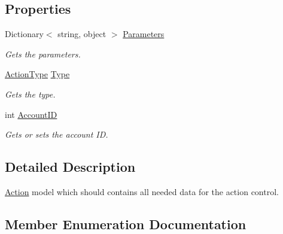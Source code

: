 \subsection*{Properties}
\begin{DoxyCompactItemize}
\item 
Dictionary$<$ string, object $>$ \hyperlink{classCore_1_1Models_1_1Action_a5b7b51347229bf4ca6ab02b419c476b8}{Parameters}
\begin{DoxyCompactList}\small\item\em Gets the parameters. \end{DoxyCompactList}\item 
\hyperlink{classCore_1_1Models_1_1Action_a9e9cef4702eef3e7d99f5db15e8c4640}{Action\+Type} \hyperlink{classCore_1_1Models_1_1Action_abb5ac940b539ea5f61f866c219dcd858}{Type}
\begin{DoxyCompactList}\small\item\em Gets the type. \end{DoxyCompactList}\item 
int \hyperlink{classCore_1_1Models_1_1Action_ae2defe30307109c1265b4cf16c001553}{Account\+I\+D}
\begin{DoxyCompactList}\small\item\em Gets or sets the account I\+D. \end{DoxyCompactList}\end{DoxyCompactItemize}


\subsection{Detailed Description}
\hyperlink{classCore_1_1Models_1_1Action}{Action} model which should contains all needed data for the action control. 



\subsection{Member Enumeration Documentation}
\hypertarget{classCore_1_1Models_1_1Action_a9e9cef4702eef3e7d99f5db15e8c4640}{}
